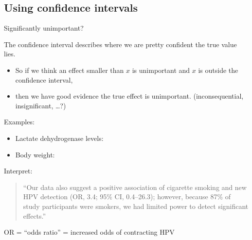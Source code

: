 \subsection{Using confidence intervals}

\begin{frame}{Significantly unimportant?}

    The \alert{confidence interval} describes where we are pretty confident the true value lies.

    \begin{itemize}

    \item So if we think an effect smaller than $x$ is \alert{unimportant}
      and $x$ is outside the confidence interval,

    \item then we have good evidence the true effect is unimportant.
      (inconsequential, insignificant, \ldots?)

    \end{itemize}

    \vspace{2em}

    Examples:
    \begin{itemize}
      \item Lactate dehydrogenase levels:
      \item Body weight:
    \end{itemize}

\end{frame}

\begin{frame}{Interpret:}

  \begin{quote}
    ``Our data also suggest a positive association of cigarette smoking and new HPV detection (OR, 3.4; 95\% CI, 0.4--26.3); {however, because 87\% of study participants were smokers, we had limited power to detect significant effects.}''
  \end{quote}

  \vspace{2em}

  OR = ``odds ratio'' = increased odds of contracting HPV

\end{frame}



